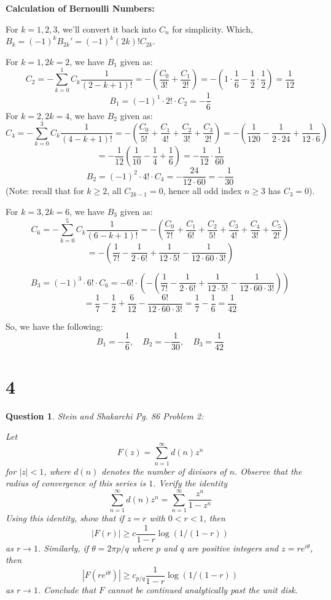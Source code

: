 \documentclass{article}
\newtheorem{question}{Question}
\begin{document}
\textbf{Calculation of Bernoulli Numbers:}

For $k=1,2,3$, we'll convert it back into $C_n$ for simplicity. Which, $B_k=(-1)^kB_{2k}'=(-1)^k(2k)!C_{2k}$.

For $k=1, 2k=2$, we have $B_1$ given as:
$$C_2=-\sum_{k=0}^{1}C_k\frac{1}{(2-k+1)!}=-\left(\frac{C_0}{3!}+\frac{C_1}{2!}\right)=-\left(1\cdot\frac{1}{6}-\frac{1}{2}\cdot\frac{1}{2}\right)=\frac{1}{12}$$
$$B_1=(-1)^1\cdot 2!\cdot C_2 = -\frac{1}{6}$$
For $k=2,2k=4$, we have $B_2$ given as:
$$C_4=-\sum_{k=0}^{3}C_k\frac{1}{(4-k+1)!}=-\left(\frac{C_0}{5!}+\frac{C_1}{4!}+\frac{C_2}{3!}+\frac{C_3}{2!}\right)=-\left(\frac{1}{120}-\frac{1}{2\cdot 24}+\frac{1}{12\cdot 6}\right)$$
$$= -\frac{1}{12}\left(\frac{1}{10}-\frac{1}{4}+\frac{1}{6}\right)=-\frac{1}{12}\cdot\frac{1}{60}$$
$$B_2=(-1)^2\cdot 4!\cdot C_4=-\frac{24}{12\cdot 60}=-\frac{1}{30}$$
(Note: recall that for $k\geq 2$, all $C_{2k-1}=0$, hence all odd index $n\geq 3$ has $C_3=0$).

For $k=3,2k=6$, we have $B_3$ given as:
$$C_6=-\sum_{k=0}^{5}C_k\frac{1}{(6-k+1)!}=-\left(\frac{C_0}{7!}+\frac{C_1}{6!}+\frac{C_2}{5!}+\frac{C_3}{4!}+\frac{C_4}{3!}+\frac{C_5}{2!}\right)$$
$$=-\left(\frac{1}{7!}-\frac{1}{2\cdot 6!}+\frac{1}{12\cdot 5!}-\frac{1}{12\cdot 60\cdot 3!}\right)$$

$$B_3=(-1)^3\cdot 6!\cdot C_6 = -6!\cdot \left(-\left(\frac{1}{7!}-\frac{1}{2\cdot 6!}+\frac{1}{12\cdot 5!}-\frac{1}{12\cdot 60\cdot 3!}\right)\right)$$
$$=\frac{1}{7}-\frac{1}{2}+\frac{6}{12}-\frac{6!}{12\cdot 60 \cdot 3!}=\frac{1}{7}-\frac{1}{6}=\frac{1}{42}$$

So, we have the following:
$$B_1=-\frac{1}{6},\quad B_2=-\frac{1}{30},\quad B_3=\frac{1}{42}$$

\hfil

\hfil

\section*{4}
\begin{myBox}[]{}
    \begin{question}
        Stein and Shakarchi Pg. 86 Problem 2:

        Let 
        $$F(z)=\sum_{n=1}^{\infty}d(n)z^n$$
        for $|z|<1$, where $d(n)$ denotes the number of divisors of $n$. Observe that the radius of convergence of this series is $1$.
        Verify the identity
        $$\sum_{n=1}^{\infty}d(n)z^n=\sum_{n=1}^{\infty}\frac{z^n}{1-z^n}$$
        Using this identity, show that if $z=r$ with $0<r<1$, then
        $$|F(r)|\geq c\frac{1}{1-r}\log(1/(1-r))$$
        as $r\rightarrow 1$. Similarly, if $\theta = 2\pi p/q$ where $p$ and $q$ are positive integers and $z=re^{i\theta}$, then
        $$|F(re^{i\theta})|\geq c_{p/q}\frac{1}{1-r}\log(1/(1-r))$$
        as $r\rightarrow 1$. Conclude that $F$ cannot be continued analytically past the unit disk.
    \end{question}
\end{myBox}
\end{document}
